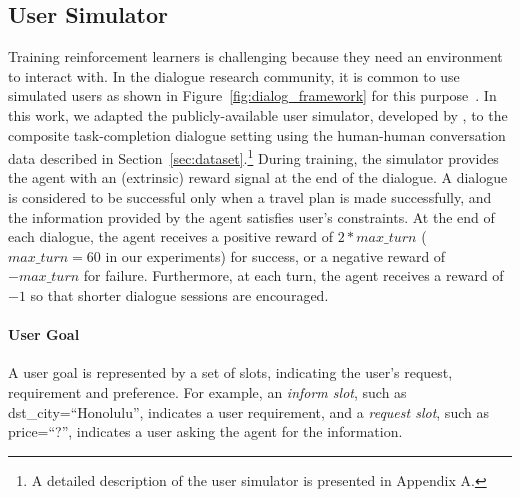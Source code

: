 \documentclass[11pt,letterpaper]{article}
\begin{document}
\subsection{User Simulator}
Training reinforcement learners is challenging because they need an environment to interact with. 
In the dialogue research community, it is common to use simulated users as shown in Figure~\ref{fig:dialog_framework} for this purpose~\cite{DBLP:conf/naacl/SchatzmannTWYY07,DBLP:conf/interspeech/AsriHS16}. In this work, we adapted the publicly-available user simulator, developed by \citet{li2016user}, to the composite task-completion dialogue setting using the human-human conversation data described in Section~\ref{sec:dataset}.\footnote{A detailed description of the user simulator is presented in Appendix A.} During training, the simulator provides the agent with an (extrinsic) reward signal at the end of the dialogue. A dialogue is considered to be successful only when a travel plan is made successfully, and the information provided by the agent satisfies user's constraints. At the end of each dialogue, the agent receives a positive reward of $2*max\_turn$ ($max\_turn=60$ in our experiments) for success, or a negative reward of $-max\_turn$ for failure.  Furthermore, at each turn, the agent receives a reward of $-1$ so that shorter dialogue sessions are encouraged.

\paragraph{User Goal} 
A user goal is represented by a set of slots, indicating the user's request, requirement and preference. For example, an \textit{inform slot}, such as \textsf{dst\_city=``Honolulu''}, indicates a user requirement, and a \textit{request slot}, such as \textsf{price=``?''}, indicates a user asking the agent for the information.
\end{document}
